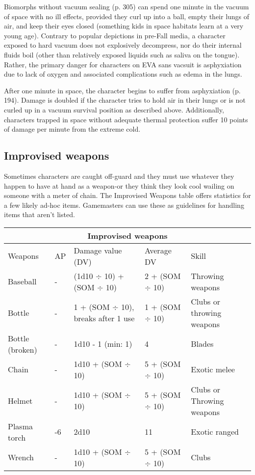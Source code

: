 Biomorphs without vacuum sealing (p. 305) can spend one minute in the vacuum of space with no ill effects, provided they curl up into a ball, empty their lungs of air, and keep their eyes closed (something kids in space habitats learn at a very young age). Contrary to popular depictions in pre-Fall media, a character exposed to hard vacuum does not explosively decompress, nor do their internal fluids boil (other than relatively exposed liquids such as saliva on the tongue). Rather, the primary danger for characters on EVA sans vacsuit is asphyxiation due to lack of oxygen and associated complications such as edema in the lungs.

After one minute in space, the character begins to suffer from asphyxiation (p. 194). Damage is doubled if the character tries to hold air in their lungs or is not curled up in a vacuum survival position as described above. Additionally, characters trapped in space without adequate thermal protection suffer 10 points of damage per minute from the extreme cold.

\subsection{Improvised weapons}
\label{sec:improvised-weapons}

Sometimes characters are caught off-guard and they must use whatever they happen to have at hand as a weapon-or they think they look cool wailing on someone with a meter of chain. The Improvised Weapons table offers statistics for a few likely ad-hoc items. Gamemasters can use these as guidelines for handling items that aren’t listed.

\begin{table} \begin{tabular}{|l|l|l|l|l|}
\hline \multicolumn{5}{|c|}{\textbf{Improvised weapons}} \\
\hline Weapons			& AP	& Damage value (DV)						& Average DV			& Skill \\
\hline Baseball		& -	& (1d10 $\div$ 10) + (SOM $\div$ 10)		& 2 + (SOM $\div$ 10)	& Throwing weapons \\
\hline Bottle			& -	& 1 + (SOM $\div$ 10), breaks after 1 use	& 1 + (SOM $\div$ 10)	& Clubs or throwing weapons \\
\hline Bottle (broken)	& -	& 1d10 - 1 (min: 1)						& 4					& Blades \\
\hline Chain			& -	& 1d10 + (SOM $\div$ 10)					& 5 + (SOM $\div$ 10)	& Exotic melee \\
\hline Helmet			& -	& 1d10 + (SOM $\div$ 10)					& 5 + (SOM $\div$ 10)	& Clubs or Throwing weapons \\
\hline Plasma torch		& -6	& 2d10								& 11					& Exotic ranged \\
\hline Wrench			& -  & 1d10 + (SOM $\div$ 10)					& 5 + (SOM $\div$ 10)	& Clubs \\
\hline
\end{tabular}
\label{table:improvised-weapons}
\end{table}


